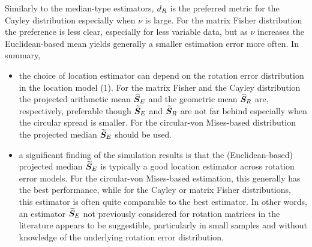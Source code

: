 Similarly to the median-type estimators, ${d_R}$ is the preferred metric for the Cayley distribution especially when $\nu$ is large.  For the  matrix Fisher distribution the preference is less clear, especially for less variable data, but as $\nu$ increases the Euclidean-based mean yields generally a smaller estimation error more often. In summary,
\begin{itemize}
\item the choice of location estimator can depend on the rotation error distribution in the location model (1).  For the matrix Fisher and the Cayley distribution  the projected arithmetic mean ${\widehat{\bm S}_E}$ and the geometric mean ${\widehat{\bm S}_R}$ are, respectively, preferable though ${\widetilde{\bm S}_E}$ and ${\widetilde{\bm S}_R}$ are not far behind especially when the circular spread is smaller. For the circular-von Mises-based distribution  the projected median ${\widetilde{\bm S}_E}$  should be used.

\item   a significant finding of the simulation results is that the (Euclidean-based)  projected median ${\widetilde{\bm S}_E}$ is typically a good location estimator across rotation error models.  For the circular-von Mises-based estimation, this generally has the best performance, while for the Cayley or matrix Fisher distributions, this estimator is often quite comparable to the best estimator.  In other words, an estimator ${\widetilde{\bm S}_E}$ not previously considered for rotation matrices in the literature appears to be suggestible, particularly in small samples and without knowledge of the underlying rotation error distribution.

\end{itemize}